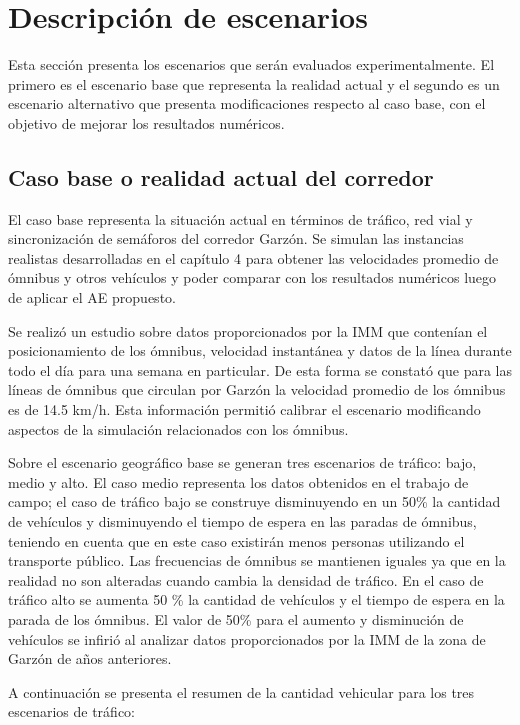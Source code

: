 \section{Descripción de escenarios}
Esta sección presenta los escenarios que serán evaluados experimentalmente. El primero es el escenario base que representa la realidad actual y el segundo es un escenario alternativo que presenta modificaciones respecto al caso base, con el objetivo de mejorar los resultados numéricos.

\subsection{Caso base o realidad actual del corredor}
El caso base representa la situación actual en términos de tráfico, red vial y sincronización de semáforos del corredor Garzón. Se simulan las instancias realistas desarrolladas en el capítulo 4 para obtener las velocidades promedio de ómnibus y otros vehículos y poder comparar con los resultados numéricos luego de aplicar el AE propuesto.  

Se realizó un estudio sobre datos proporcionados por la IMM que contenían el posicionamiento de los ómnibus, velocidad instantánea y datos de la línea durante todo el día para una semana en particular. De esta forma se constató que para las líneas de ómnibus que circulan por Garzón la velocidad promedio de los ómnibus es de 14.5 km/h. Esta información permitió calibrar el escenario modificando aspectos de la simulación relacionados con los ómnibus.

Sobre el escenario geográfico base se generan tres escenarios de tráfico: bajo, medio y alto. El caso medio representa los datos obtenidos en el trabajo de campo; el caso de tráfico bajo se construye disminuyendo en un 50\% la cantidad de vehículos y disminuyendo el tiempo de espera en las paradas de ómnibus, teniendo en cuenta que en este caso existirán menos personas utilizando el transporte público. Las frecuencias de ómnibus se mantienen iguales ya que en la realidad no son alteradas cuando cambia la densidad de tráfico. En el caso de tráfico alto se aumenta 50 \%  la cantidad de vehículos y el tiempo de espera en la parada de los ómnibus. El valor de 50\% para el aumento y disminución de vehículos se infirió al analizar datos proporcionados por la IMM de la zona de Garzón de años anteriores. \newline

A continuación se presenta el resumen de la cantidad vehicular para los tres escenarios de tráfico:

